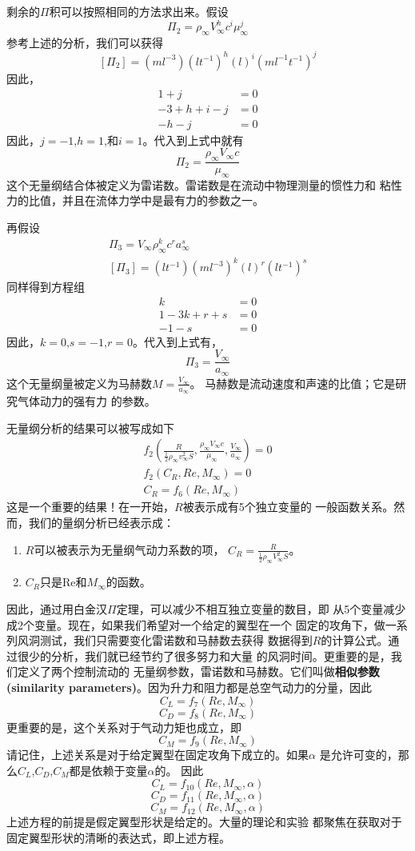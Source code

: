 剩余的$\Pi$积可以按照相同的方法求出来。假设
\[
  \Pi_2=\rho_\infty V_\infty ^h c^i \mu_\infty ^j
\]
参考上述的分析，我们可以获得
\[
  [\Pi_2]=(ml^{-3})(lt^{-1})^h(l)^i(ml^{-1}t^{-1})^j
\]
因此，
\begin{align*}
  1+j&=0\\ 
  -3+h+i-j&=0\\ 
  -h-j&=0
\end{align*}
因此，$j=-1$,$h=1$,和$i=1$。代入到上式中就有
\[
  \Pi_2=\frac{\rho_\infty V_\infty c}{\mu_\infty}
\]
这个无量纲结合体被定义为雷诺数。雷诺数是在流动中物理测量的惯性力和
粘性力的比值，并且在流体力学中是最有力的参数之一。

再假设
\begin{align*}
  \Pi_3=V_\infty \rho_\infty ^k c^r a_\infty ^s \\ 
  [\Pi_3]=(lt^{-1})(ml^{-3})^k(l)^r(lt^{-1})^s 
\end{align*}
同样得到方程组
\[
  \begin{split}
    k&=0\\ 
    1-3k+r+s&=0\\ 
    -1-s&=0
  \end{split}
\]
因此，$k=0$,$s=-1$,$r=0$。代入到上式有，
\[
  \Pi_3=\frac{V_\infty}{a_\infty}
\]
这个无量纲量被定义为马赫数$M=\frac{V_\infty}{a_\infty}$。
马赫数是流动速度和声速的比值；它是研究气体动力的强有力
的参数。

无量纲分析的结果可以被写成如下
\begin{align*}
  f_2(\frac{R}{\frac{1}{2}\rho_\infty v_\infty ^2 S},
  \frac{\rho_\infty V_\infty c }{\mu_\infty },
  \frac{V_\infty }{a_\infty})=0\\ 
  f_2(C_R,Re,M_\infty)=0\\ 
  C_R=f_6(Re,M_\infty)
\end{align*}
这是一个重要的结果！在一开始，$R$被表示成有5个独立变量的
一般函数关系。然而，我们的量纲分析已经表示成：
\begin{enumerate}
  \item $R$可以被表示为无量纲气动力系数的项，
    $C_R=\frac{R}{\frac{1}{2}\rho_\infty V_\infty ^2 S }$。
  \item $C_R$只是Re和$M_\infty$的函数。 
\end{enumerate}
因此，通过用白金汉$\Pi$定理，可以减少不相互独立变量的数目，即
从5个变量减少成2个变量。现在，如果我们希望对一个给定的翼型在一个
固定的攻角下，做一系列风洞测试，我们只需要变化雷诺数和马赫数去获得
数据得到$R$的计算公式。通过很少的分析，我们就已经节约了很多努力和大量
的风洞时间。更重要的是，我们定义了两个控制流动的
无量纲参数，雷诺数和马赫数。它们叫做{\bfseries 相似参数(similarity 
parameters)}。因为升力和阻力都是总空气动力的分量，因此
\[
  C_L=f_7(Re,M_\infty)
\]
\[
  C_D=f_8(Re,M_\infty)
\]
更重要的是，这个关系对于气动力矩也成立，即
\[
  C_M=f_9(Re,M_\infty)
\]
请记住，上述关系是对于给定翼型在固定攻角下成立的。如果$\alpha$
是允许可变的，那么$C_L$,$C_D$,$C_M$都是依赖于变量$\alpha$的。
因此
\[
  C_L=f_{10}(Re,M_\infty,\alpha)
\]
\[
  C_D=f_{11}(Re,M_\infty,\alpha)
\]
\[
  C_M=f_{12}(Re,M_\infty,\alpha)
\]
上述方程的前提是假定翼型形状是给定的。大量的理论和实验
都聚焦在获取对于固定翼型形状的清晰的表达式，即上述方程。

